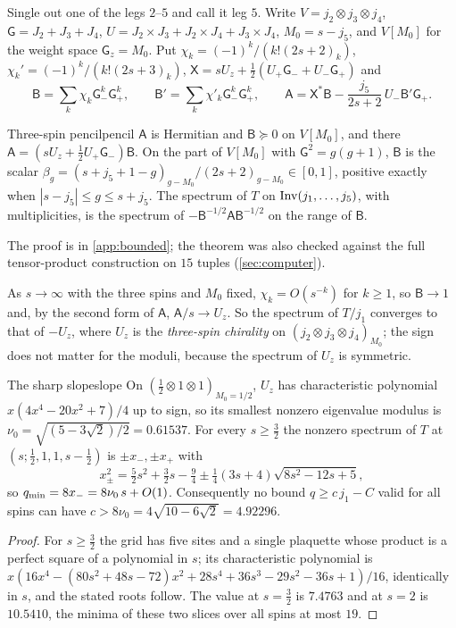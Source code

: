 Single out one of the legs $2$--$5$ and call it leg $5$. Write $V=j_2\otimes j_3\otimes
j_4$, $\mathsf G=J_2+J_3+J_4$, $U=J_2\times J_3+J_2\times J_4+J_3\times J_4$,
$M_0=s-j_5$, and $V[M_0]$ for the weight space $\mathsf G_z=M_0$. Put
$\chi_k=(-1)^k/(k!(2s+2)_k)$, $\chi_k'=(-1)^k/(k!(2s+3)_k)$,
$\mathsf X=sU_z+\frac12(U_+\mathsf G_-+U_-\mathsf G_+)$ and
\[
  \mathsf B=\sum_k\chi_k\mathsf G_-^k\mathsf G_+^k,\qquad \mathsf B'=\sum_k\chi'_k\mathsf G_-^k\mathsf G_+^k,\qquad
  \mathsf A=\mathsf X^*\mathsf B-\frac{j_5}{2s+2}\,U_-\mathsf B'\mathsf G_+ .
\]

\begin{theorem}{Three-spin pencil}{pencil}
$\mathsf A$ is Hermitian and $\mathsf B\succeq0$ on $V[M_0]$, and there
$\mathsf A=(sU_z+\frac12U_+\mathsf G_-)\mathsf B$. On the part of $V[M_0]$ with
$\mathsf G^2=g(g+1)$, $\mathsf B$ is the scalar
$\beta_g=(s+j_5+1-g)_{g-M_0}/(2s+2)_{g-M_0}\in[0,1]$, positive exactly when
$|s-j_5|\le g\le s+j_5$. The spectrum of $T$ on $\operatorname{Inv}(j_1,\dots,j_5)$, with
multiplicities, is the spectrum of $-\mathsf B^{-1/2}\mathsf A\mathsf B^{-1/2}$ on the
range of $\mathsf B$.
\end{theorem}

The proof is in \cref{app:bounded}; the theorem was also checked against the full
tensor-product construction on $15$ tuples (\cref{sec:computer}).

As $s\to\infty$ with the three spins and $M_0$ fixed, $\chi_k=O(s^{-k})$ for $k\ge1$, so
$\mathsf B\to1$ and, by the second form of $\mathsf A$, $\mathsf A/s\to U_z$. So the
spectrum of $T/j_1$ converges to that of $-U_z$, where $U_z$ is the \emph{three-spin
chirality} on $(j_2\otimes j_3\otimes j_4)_{M_0}$; the sign does not matter for the
moduli, because the spectrum of $U_z$ is symmetric.

\begin{theorem}{The sharp slope}{slope}
On $(\frac12\otimes1\otimes1)_{M_0=1/2}$, $U_z$ has characteristic polynomial
$x(4x^4-20x^2+7)/4$ up to sign, so its smallest nonzero eigenvalue modulus is
$\nu_0=\sqrt{(5-3\sqrt2)/2}=0.61537$. For every $s\ge\frac32$ the nonzero spectrum of $T$
at $(s;\frac12,1,1,s-\frac12)$ is $\pm x_-,\pm x_+$ with
\[
  x_\pm^2=\tfrac52s^2+\tfrac32s-\tfrac94\pm\tfrac14(3s+4)\sqrt{8s^2-12s+5},
\]
so $q_{\min}=8x_-=8\nu_0\,s+O(1)$. Consequently no bound $q\ge c\,j_1-C$ valid for all
spins can have $c>8\nu_0=4\sqrt{10-6\sqrt2}=4.92296$.
\end{theorem}

\begin{proof}
For $s\ge\frac32$ the grid has five sites and a single plaquette whose product is a
perfect square of a polynomial in $s$; its characteristic polynomial is
$x(16x^4-(80s^2+48s-72)x^2+28s^4+36s^3-29s^2-36s+1)/16$, identically in $s$, and the
stated roots follow. The value at $s=\frac32$ is $7.4763$ and at $s=2$ is $10.5410$, the
minima of these two slices over all spins at most $19$.
\end{proof}

